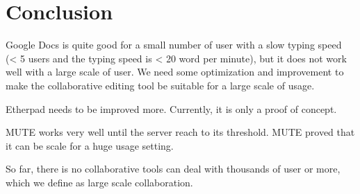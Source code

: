 \documentclass[a4paper,12pt]{report}
\begin{document}
\section{Conclusion}
Google Docs is quite good for a small number of user with a slow typing speed (< 5 users and the typing speed is < 20 word per minute), but it does not work well with a large scale of user. We need some optimization and improvement to make the collaborative editing tool be suitable for a large scale of usage.

Etherpad needs to be improved more. Currently, it is only a proof of concept.

MUTE works very well until the server reach to its threshold. MUTE proved that it can be scale for a huge usage setting.

So far, there is no collaborative tools can deal with thousands of user or more, which we define as large scale collaboration.
\end{document}
